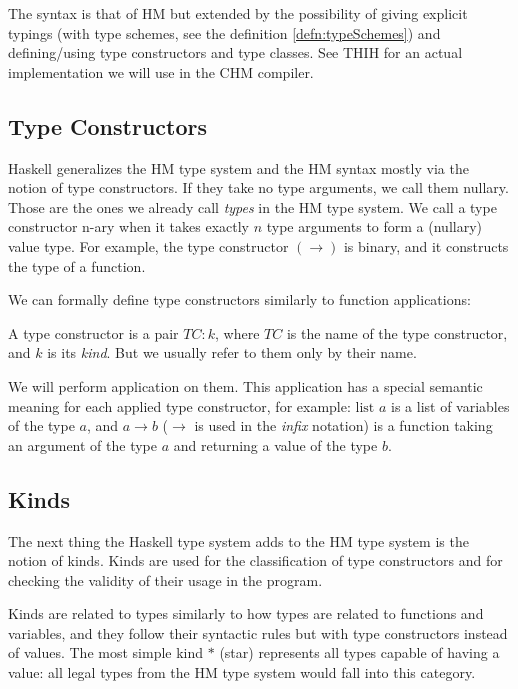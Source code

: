 The syntax is that of HM but extended by the possibility of giving explicit typings (with type schemes, see the definition \ref{defn:typeSchemes}) and defining/using type constructors and type classes. See THIH \cite{jones1999typing} for an actual implementation we will use in the CHM compiler.

\subsection{Type Constructors}

Haskell generalizes the HM type system and the HM syntax mostly via the notion of type constructors. If they take no type arguments, we call them nullary. Those are the ones we already call \emph{types} in the HM type system. We call a type constructor n-ary when it takes exactly $n$ type arguments to form a (nullary) value type. For example, the type constructor $(\rightarrow)$ is binary, and it constructs the type of a function.

We can formally define type constructors similarly to function applications:

\begin{defn}
    A type constructor is a pair $TC : k$, where $TC$ is the name of the type constructor, and $k$ is its \emph{kind}. But we usually refer to them only by their name.

    We will perform application on them. This application has a special semantic meaning for each applied type constructor, for example: $\text{list } a$ is a list of variables of the type $a$, and $a \rightarrow b$ ($\rightarrow$ is used in the \emph{infix} notation) is a function taking an argument of the type $a$ and returning a value of the type $b$.
\end{defn}

\subsection{Kinds}

The next thing the Haskell type system adds to the HM type system is the notion of kinds. Kinds are used for the classification of type constructors and for checking the validity of their usage in the program.

Kinds are related to types similarly to how types are related to functions and variables, and they follow their syntactic rules but with type constructors instead of values. The most simple kind $*$ (star) represents all types capable of having a value: all legal types from the HM type system would fall into this category.

